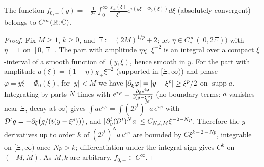 \begin{lemma}[Smoothness of $f_{0,+}$]
  \label{lem:c07_f0plus_smooth}
  The function $f_{0,+}(y)=-\frac1{2\pi}\int_0^\infty\frac{\chi_+(\xi)}{\xi^2}e^{i(y\xi-\Phi_0(\xi))}d\xi$
  (absolutely convergent) belongs to $C^\infty(\mathbb{R};\mathbb{C})$.
\end{lemma}
\begin{proof}
  Fix $M\ge1$, $k\ge0$, and $\Xi:=(2M)^{1/p}+2$; let $\eta\in C_c^\infty([0,2\Xi))$ with $\eta=1$ on
  $[0,\Xi]$. The part with amplitude $\eta\chi_+\xi^{-2}$ is an integral over a compact
  $\xi$-interval of a smooth function of $(y,\xi)$, hence smooth in $y$. For the part with amplitude
  $a(\xi)=(1-\eta)\chi_+\xi^{-2}$ (supported in $[\Xi,\infty)$) and phase $\varphi=y\xi-\Phi_0(\xi)$,
  for $|y|<M$ we have $|\partial_\xi\varphi|=|y-\xi^p|\ge\xi^p/2$ on $\operatorname{supp}a$. Integrating by parts
  $N$ times with $e^{i\varphi}=\frac{\partial_\xi e^{i\varphi}}{i(y-\xi^p)}$ (no boundary terms: $a$ vanishes near
  $\Xi$, decay at $\infty$) gives $\int a e^{i\varphi}=\int (\mathcal D^t)^Na\,e^{i\varphi}$ with
  $\mathcal D^tg=-\partial_\xi\bigl(g/(i(y-\xi^p))\bigr)$, and $|\partial_y^l(\mathcal D^t)^Na|\le C_{N,l,M}\xi^{-2-Np}$.
  Therefore the $y$-derivatives up to order $k$ of $(\mathcal D^t)^Na\,e^{i\varphi}$ are bounded by
  $C\xi^{k-2-Np}$, integrable on $[\Xi,\infty)$ once $Np>k$; differentiation under the integral sign
  gives $C^k$ on $(-M,M)$. As $M,k$ are arbitrary, $f_{0,+}\in C^\infty$.
\end{proof}

